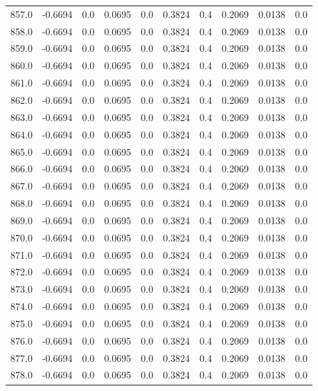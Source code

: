 \begin{longtable}{lrrrrrrrrr}
857.0 & -0.6694 & 0.0 & 0.0695 & 0.0 & 0.3824 & 0.4 & 0.2069 & 0.0138 & 0.0 \\
858.0 & -0.6694 & 0.0 & 0.0695 & 0.0 & 0.3824 & 0.4 & 0.2069 & 0.0138 & 0.0 \\
859.0 & -0.6694 & 0.0 & 0.0695 & 0.0 & 0.3824 & 0.4 & 0.2069 & 0.0138 & 0.0 \\
860.0 & -0.6694 & 0.0 & 0.0695 & 0.0 & 0.3824 & 0.4 & 0.2069 & 0.0138 & 0.0 \\
861.0 & -0.6694 & 0.0 & 0.0695 & 0.0 & 0.3824 & 0.4 & 0.2069 & 0.0138 & 0.0 \\
862.0 & -0.6694 & 0.0 & 0.0695 & 0.0 & 0.3824 & 0.4 & 0.2069 & 0.0138 & 0.0 \\
863.0 & -0.6694 & 0.0 & 0.0695 & 0.0 & 0.3824 & 0.4 & 0.2069 & 0.0138 & 0.0 \\
864.0 & -0.6694 & 0.0 & 0.0695 & 0.0 & 0.3824 & 0.4 & 0.2069 & 0.0138 & 0.0 \\
865.0 & -0.6694 & 0.0 & 0.0695 & 0.0 & 0.3824 & 0.4 & 0.2069 & 0.0138 & 0.0 \\
866.0 & -0.6694 & 0.0 & 0.0695 & 0.0 & 0.3824 & 0.4 & 0.2069 & 0.0138 & 0.0 \\
867.0 & -0.6694 & 0.0 & 0.0695 & 0.0 & 0.3824 & 0.4 & 0.2069 & 0.0138 & 0.0 \\
868.0 & -0.6694 & 0.0 & 0.0695 & 0.0 & 0.3824 & 0.4 & 0.2069 & 0.0138 & 0.0 \\
869.0 & -0.6694 & 0.0 & 0.0695 & 0.0 & 0.3824 & 0.4 & 0.2069 & 0.0138 & 0.0 \\
870.0 & -0.6694 & 0.0 & 0.0695 & 0.0 & 0.3824 & 0.4 & 0.2069 & 0.0138 & 0.0 \\
871.0 & -0.6694 & 0.0 & 0.0695 & 0.0 & 0.3824 & 0.4 & 0.2069 & 0.0138 & 0.0 \\
872.0 & -0.6694 & 0.0 & 0.0695 & 0.0 & 0.3824 & 0.4 & 0.2069 & 0.0138 & 0.0 \\
873.0 & -0.6694 & 0.0 & 0.0695 & 0.0 & 0.3824 & 0.4 & 0.2069 & 0.0138 & 0.0 \\
874.0 & -0.6694 & 0.0 & 0.0695 & 0.0 & 0.3824 & 0.4 & 0.2069 & 0.0138 & 0.0 \\
875.0 & -0.6694 & 0.0 & 0.0695 & 0.0 & 0.3824 & 0.4 & 0.2069 & 0.0138 & 0.0 \\
876.0 & -0.6694 & 0.0 & 0.0695 & 0.0 & 0.3824 & 0.4 & 0.2069 & 0.0138 & 0.0 \\
877.0 & -0.6694 & 0.0 & 0.0695 & 0.0 & 0.3824 & 0.4 & 0.2069 & 0.0138 & 0.0 \\
878.0 & -0.6694 & 0.0 & 0.0695 & 0.0 & 0.3824 & 0.4 & 0.2069 & 0.0138 & 0.0 \\

\end{longtable}
